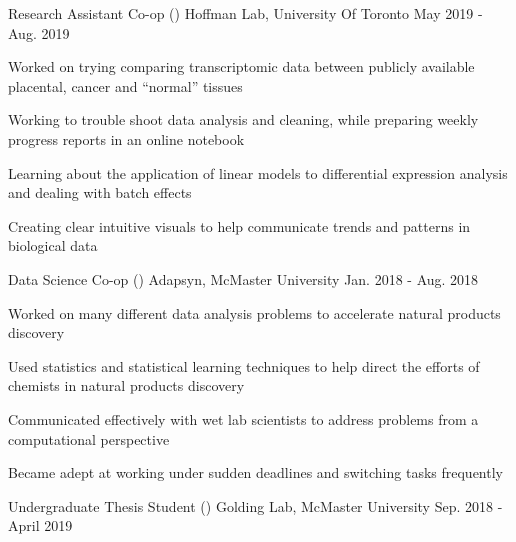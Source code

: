 \begin{cventries}
    \cventry
    {Research Assistant Co-op ()}
      {Hoffman Lab, University Of Toronto}
      {May 2019 - Aug. 2019}
      {}
      {
        \begin{cvitems}
         \item {Worked on trying comparing transcriptomic data between publicly available placental, cancer and ``normal'' tissues}
         \item {Working to trouble shoot data analysis and cleaning, while preparing weekly progress reports in an online notebook}
         \item {Learning about the application of linear models to differential expression analysis and dealing with batch effects}
         \item {Creating clear intuitive visuals to help communicate trends and patterns in biological data}
        \end{cvitems}
      }
    \cventry
      {Data Science Co-op ()}
      {Adapsyn, McMaster University}
      {Jan. 2018 - Aug. 2018}
      {}
      {
        \begin{cvitems}
         \item {Worked on many different data analysis problems to accelerate natural products discovery}
         \item {Used statistics and statistical learning techniques to help direct the efforts of chemists in natural products discovery}
         \item {Communicated effectively with wet lab scientists to address problems from a computational perspective}
         \item {Became adept at working under sudden deadlines and switching tasks frequently}
        \end{cvitems}
      }
    \cventry
      {Undergraduate Thesis Student ()}
      {Golding Lab, McMaster University}
      {Sep. 2018 - April 2019}
      {}
      {
        \begin{cvitems}

\end{cvitems}}
\end{cventries}
